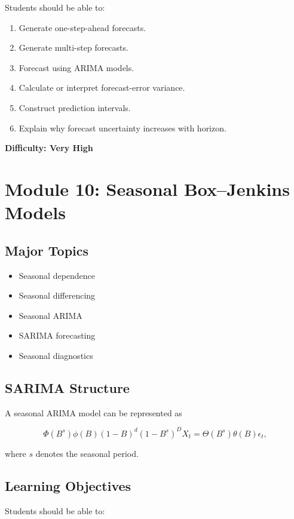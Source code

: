 \documentclass[11pt]{article}
\begin{document}
Students should be able to:

\begin{enumerate}
    \item Generate one-step-ahead forecasts.
    \item Generate multi-step forecasts.
    \item Forecast using ARIMA models.
    \item Calculate or interpret forecast-error variance.
    \item Construct prediction intervals.
    \item Explain why forecast uncertainty increases with horizon.
\end{enumerate}

\textbf{Difficulty: Very High}

\section{Module 10: Seasonal Box--Jenkins Models}

\subsection{Major Topics}

\begin{itemize}
    \item Seasonal dependence
    \item Seasonal differencing
    \item Seasonal ARIMA
    \item SARIMA forecasting
    \item Seasonal diagnostics
\end{itemize}

\subsection{SARIMA Structure}

A seasonal ARIMA model can be represented as

\[
\Phi(B^s)
\phi(B)
(1-B)^d
(1-B^s)^D
X_t
=
\Theta(B^s)
\theta(B)
\epsilon_t,
\]

where $s$ denotes the seasonal period.

\subsection{Learning Objectives}

Students should be able to:
\end{document}
